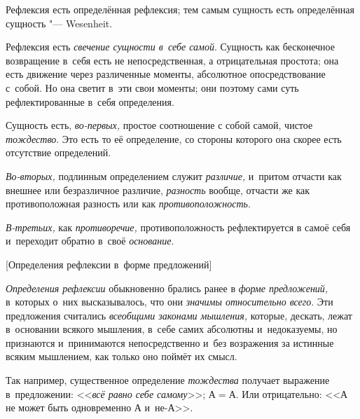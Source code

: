 
Рефлексия есть определённая рефлексия; тем самым
сущность есть определённая сущность "--- Wesenheit.

Рефлексия есть {\em свечение сущности в~себе самой}.
Сущность как бесконечное возвращение в~себя есть не непосредственная, а
отрицательная простота; она есть движение через различенные моменты,
абсолютное опосредствование с~собой. Но она светит в~эти свои моменты; они
поэтому сами суть рефлектированные в~себя определения.

Сущность есть, {\em во-первых,} простое соотношение с
собой самой, чистое {\em тождество}. Это есть то её
определение, со стороны которого она скорее есть отсутствие определений.

{\em Во-вторых,} подлинным определением служит {\em различие,} и~притом
отчасти как внешнее или безразличное различие, {\em разность} вообще,
отчасти же как противоположная разность или как {\em противоположность}.

{\em В-третьих,} как {\em противоречие,} противоположность рефлектируется в
самоё себя и~переходит обратно в~своё {\em основание}.

%
  {[Определения рефлексии в~форме предложений]}

{\em Определения рефлексии} обыкновенно брались ранее в
{\em форме предложений,} в~которых о~них высказывалось,
что они {\em значимы относительно всего}. Эти
предложения считались {\em всеобщими законами
мышления,} которые, дескать, лежат в~основании всякого мышления, в~себе
самих абсолютны и~недоказуемы, но признаются и~принимаются непосредственно
и~без возражения за истинные всяким мышлением, как только оно поймёт их смысл.

Так например, существенное определение {\em тождества}
получает выражение в~предложении: <<{\em всё равно себе
самому}>>; $А=А$. Или отрицательно: <<$А$ не может
быть одновременно $А$ и~не-$А$>>.

